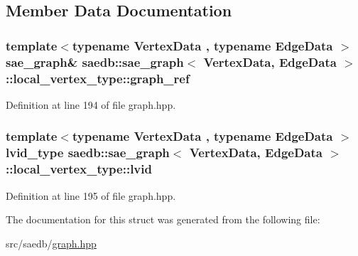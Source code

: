\subsection{Member Data Documentation}
\hypertarget{structsaedb_1_1sae__graph_1_1local__vertex__type_ac373fad8819c0a5a52534d5446189b24}{
\subsubsection[{graph\-\_\-ref}]{\setlength{\rightskip}{0pt plus 5cm}template$<$typename Vertex\-Data , typename Edge\-Data $>$ {\bf sae\-\_\-graph}\& {\bf saedb\-::sae\-\_\-graph}$<$ Vertex\-Data, Edge\-Data $>$\-::local\-\_\-vertex\-\_\-type\-::graph\-\_\-ref}}\label{d7/d91/structsaedb_1_1sae__graph_1_1local__vertex__type_ac373fad8819c0a5a52534d5446189b24}


Definition at line 194 of file graph.\-hpp.

\hypertarget{structsaedb_1_1sae__graph_1_1local__vertex__type_a551f1e6b9c35f4849cf009e7a4c8e058}{
\subsubsection[{lvid}]{\setlength{\rightskip}{0pt plus 5cm}template$<$typename Vertex\-Data , typename Edge\-Data $>$ {\bf lvid\-\_\-type} {\bf saedb\-::sae\-\_\-graph}$<$ Vertex\-Data, Edge\-Data $>$\-::local\-\_\-vertex\-\_\-type\-::lvid}}\label{d7/d91/structsaedb_1_1sae__graph_1_1local__vertex__type_a551f1e6b9c35f4849cf009e7a4c8e058}


Definition at line 195 of file graph.\-hpp.



The documentation for this struct was generated from the following file\-:\begin{DoxyCompactItemize}
\item 
src/saedb/\hyperlink{graph_8hpp}{graph.\-hpp}\end{DoxyCompactItemize}
